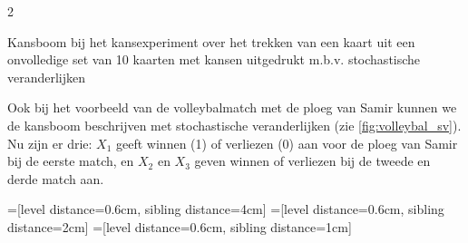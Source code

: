 \begin{multicols} {2}
\begin{afbeeldingenv}
\caption{Kansboom bij het kansexperiment over het trekken van een kaart uit een onvolledige set van 10 kaarten met kansen uitgedrukt m.b.v. stochastische veranderlijken}
\label{fig:kaartvb_sv}
\end{afbeeldingenv}


Ook bij het voorbeeld van de volleybalmatch met de ploeg van Samir kunnen we de kansboom beschrijven met stochastische veranderlijken (zie \autoref{fig:volleybal_sv}). Nu zijn er drie: $X_1$ geeft winnen (1) of verliezen (0) aan voor de ploeg van Samir bij de eerste match, en $X_2$ en $X_3$ geven winnen of verliezen bij de tweede en derde match aan.

=[level distance=0.6cm, sibling distance=4cm]
=[level distance=0.6cm, sibling distance=2cm]
=[level distance=0.6cm, sibling distance=1cm]



\end{multicols}
